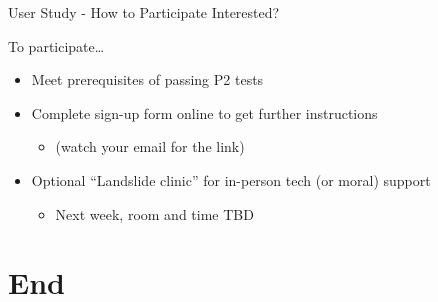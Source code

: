 \documentclass[xcolor=dvipsnames]{beamer}
\begin{document}
\begin{frame}{User Study - How to Participate}
	Interested?
	\linegap

	To participate\dots
	\begin{itemize}
		\item Meet prerequisites of passing P2 tests
		\item Complete sign-up form online to get further instructions
			\begin{itemize}
				\item (watch your email for the link)
			\end{itemize}
		\item Optional ``Landslide clinic'' for in-person tech (or moral) support
			\begin{itemize}
				\item Next week, room and time TBD
			\end{itemize}
	\end{itemize}

\end{frame}


\section{End}

\end{document}
